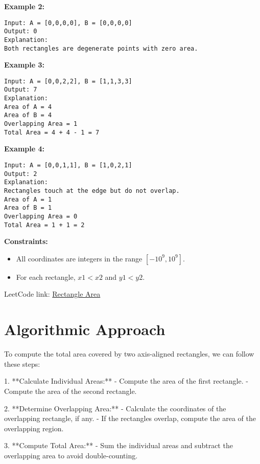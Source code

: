 \textbf{Example 2:}

\begin{verbatim}
Input: A = [0,0,0,0], B = [0,0,0,0]
Output: 0
Explanation:
Both rectangles are degenerate points with zero area.
\end{verbatim}

\textbf{Example 3:}

\begin{verbatim}
Input: A = [0,0,2,2], B = [1,1,3,3]
Output: 7
Explanation:
Area of A = 4
Area of B = 4
Overlapping Area = 1
Total Area = 4 + 4 - 1 = 7
\end{verbatim}

\textbf{Example 4:}

\begin{verbatim}
Input: A = [0,0,1,1], B = [1,0,2,1]
Output: 2
Explanation:
Rectangles touch at the edge but do not overlap.
Area of A = 1
Area of B = 1
Overlapping Area = 0
Total Area = 1 + 1 = 2
\end{verbatim}

\textbf{Constraints:}

\begin{itemize}
    \item All coordinates are integers in the range \([-10^9, 10^9]\).
    \item For each rectangle, \(x1 < x2\) and \(y1 < y2\).
\end{itemize}

LeetCode link: \href{https://leetcode.com/problems/rectangle-area/}{Rectangle Area}

\section*{Algorithmic Approach}

To compute the total area covered by two axis-aligned rectangles, we can follow these steps:

1. **Calculate Individual Areas:**
   - Compute the area of the first rectangle.
   - Compute the area of the second rectangle.

2. **Determine Overlapping Area:**
   - Calculate the coordinates of the overlapping rectangle, if any.
   - If the rectangles overlap, compute the area of the overlapping region.

3. **Compute Total Area:**
   - Sum the individual areas and subtract the overlapping area to avoid double-counting.


